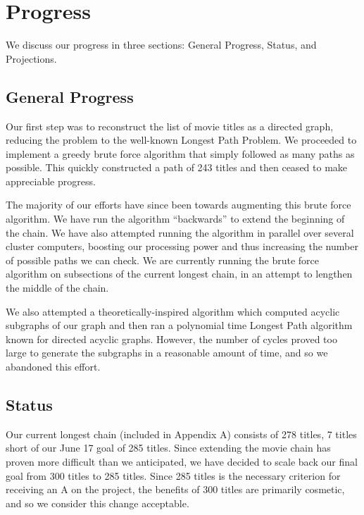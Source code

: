 \documentclass[11pt,english]{article}
\begin{document}
\vspace{-0.2cm}
\section{Progress}
We discuss our progress in three sections: General Progress, Status, and
Projections.

\vspace{-0.2cm}
\subsection{General Progress}
Our first step was to reconstruct the list of movie titles as a directed graph,
reducing the problem to the well-known Longest Path Problem.
We proceeded to implement a greedy brute force algorithm that simply followed
as many paths as possible. This quickly constructed a path of 243 titles and
then ceased to make appreciable progress.

The majority of our efforts have since been towards augmenting this brute force
algorithm. We have run the algorithm ``backwards'' to extend the beginning of
the chain. We have also attempted running the algorithm in parallel over
several cluster computers, boosting our processing power and thus increasing
the number of possible paths we can check. We are currently running the brute
force algorithm on subsections of the current longest chain, in an attempt to
lengthen the middle of the chain.

We also attempted a theoretically-inspired algorithm which computed acyclic
subgraphs of our graph and then ran a polynomial time Longest Path algorithm
known for directed acyclic graphs. However, the number of cycles proved too
large to generate the subgraphs in a reasonable amount of time, and so we
abandoned this effort.

\vspace{-0.2cm}
\subsection{Status}
Our current longest chain (included in Appendix A) consists of 278 titles,
7 titles short of our June 17 goal of 285 titles. Since extending the movie chain has
proven more difficult than we anticipated, we have decided to scale back our
final goal from 300 titles to 285 titles. Since 285 titles is the necessary
criterion for receiving an A on the project, the benefits of 300 titles are
primarily cosmetic, and so we consider this change acceptable.
\end{document}
